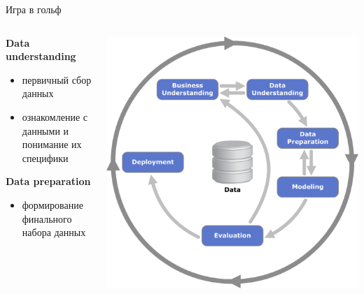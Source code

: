\documentclass[aspectratio=169]{beamer}
\begin{document}
\begin{frame}{Игра в гольф}

\begin{columns}
    \begin{column}{.7\textwidth}
		{\bf Data understanding}
		\begin{itemize}
		\item первичный сбор данных
		\item ознакомление с данными и понимание их специфики
		\end{itemize}

		\vspace{1em}

		{\bf Data preparation}
		\begin{itemize}
		\item формирование финального набора данных
		\end{itemize}
    \end{column}
    \begin{column}{.3\textwidth}
    \vspace{-0em}
		\begin{center}
   		\includegraphics[width=\textwidth]{images/crisp.png}
    \end{center}
    \end{column}
  \end{columns}

\end{frame}
\end{document}

